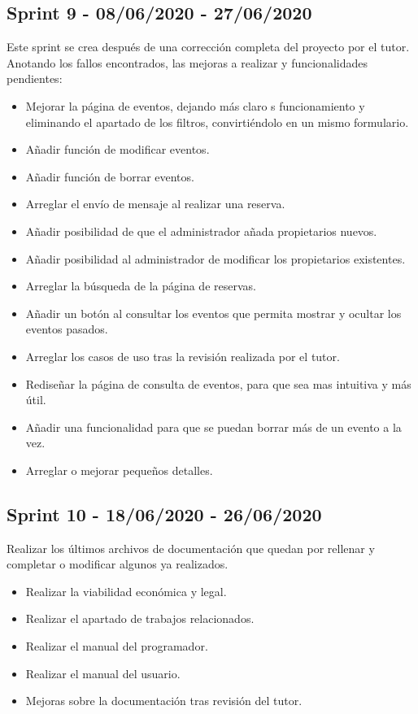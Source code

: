 \subsection{Sprint 9 - 08/06/2020 - 27/06/2020}
Este sprint se crea después de una corrección completa del proyecto por el tutor. Anotando los fallos encontrados, las mejoras a realizar y funcionalidades pendientes:
\begin{itemize}
    \item Mejorar la página de eventos, dejando más claro s funcionamiento y eliminando el apartado de los filtros, convirtiéndolo en un mismo formulario.
    \item Añadir función de modificar eventos.
    \item Añadir función de borrar eventos.
    \item Arreglar el envío de mensaje al realizar una reserva.
    \item Añadir posibilidad de que el administrador añada propietarios nuevos.
    \item Añadir posibilidad al administrador de modificar los propietarios existentes.
    \item Arreglar la búsqueda de la página de reservas.
    \item Añadir un botón al consultar los eventos que permita mostrar y ocultar los eventos pasados.
    \item Arreglar los casos de uso tras la revisión realizada por el tutor.
    \item Rediseñar la página de consulta de eventos, para que sea mas intuitiva y más útil.
    \item Añadir una funcionalidad para que se puedan borrar más de un evento a la vez.
    \item Arreglar o mejorar pequeños detalles.
\end{itemize}

\subsection{Sprint 10 - 18/06/2020 - 26/06/2020 }
Realizar los últimos archivos de documentación que quedan por rellenar y completar o modificar algunos ya realizados.
\begin{itemize}
    \item Realizar la viabilidad económica y legal.
    \item Realizar el apartado de trabajos relacionados.
    \item Realizar el manual del programador.
    \item Realizar el manual del usuario.
    \item Mejoras sobre la documentación tras revisión del tutor.
\end{itemize}

